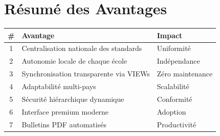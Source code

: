 \documentclass[12pt,a4paper,oneside]{report}
\begin{document}
\appendix
\chapter{Résumé des Avantages}

\begin{center}
\begin{tabularx}{\textwidth}{c X l}
\toprule
\textbf{\#} & \textbf{Avantage} & \textbf{Impact} \\
\midrule
1 & Centralisation nationale des standards & Uniformité \\
2 & Autonomie locale de chaque école & Indépendance \\
3 & Synchronisation transparente via VIEWs & Zéro maintenance \\
4 & Adaptabilité multi-pays & Scalabilité \\
5 & Sécurité hiérarchique dynamique & Conformité \\
6 & Interface premium moderne & Adoption \\
7 & Bulletins PDF automatisés & Productivité \\
\bottomrule
\end{tabularx}
\end{center}
\end{document}
